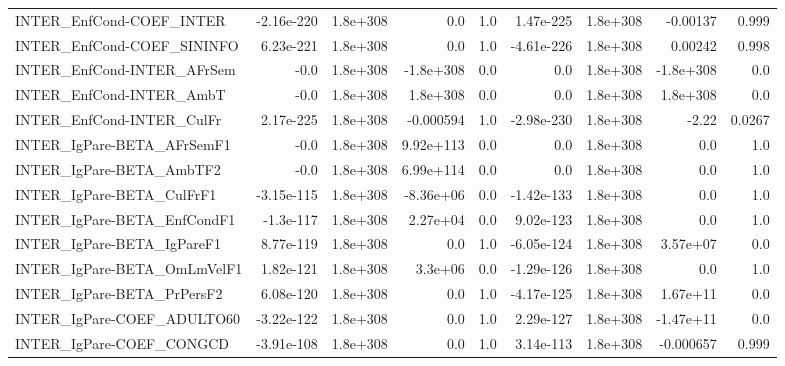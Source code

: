 \begin{tabular}{lrrrrrrrr}
INTER\_EnfCond-COEF\_INTER              &  -2.16e-220 &     1.8e+308 &        0.0 &      1.0 &  1.47e-225 &    1.8e+308 &     -0.00137 &         0.999 \\
INTER\_EnfCond-COEF\_SININFO            &   6.23e-221 &     1.8e+308 &        0.0 &      1.0 & -4.61e-226 &    1.8e+308 &      0.00242 &         0.998 \\
INTER\_EnfCond-INTER\_AFrSem            &        -0.0 &     1.8e+308 &  -1.8e+308 &      0.0 &        0.0 &    1.8e+308 &    -1.8e+308 &           0.0 \\
INTER\_EnfCond-INTER\_AmbT              &        -0.0 &     1.8e+308 &   1.8e+308 &      0.0 &        0.0 &    1.8e+308 &     1.8e+308 &           0.0 \\
INTER\_EnfCond-INTER\_CulFr             &   2.17e-225 &     1.8e+308 &  -0.000594 &      1.0 & -2.98e-230 &    1.8e+308 &        -2.22 &        0.0267 \\
INTER\_IgPare-BETA\_AFrSemF1            &        -0.0 &     1.8e+308 &  9.92e+113 &      0.0 &        0.0 &    1.8e+308 &          0.0 &           1.0 \\
INTER\_IgPare-BETA\_AmbTF2              &        -0.0 &     1.8e+308 &  6.99e+114 &      0.0 &        0.0 &    1.8e+308 &          0.0 &           1.0 \\
INTER\_IgPare-BETA\_CulFrF1             &  -3.15e-115 &     1.8e+308 &  -8.36e+06 &      0.0 & -1.42e-133 &    1.8e+308 &          0.0 &           1.0 \\
INTER\_IgPare-BETA\_EnfCondF1           &   -1.3e-117 &     1.8e+308 &   2.27e+04 &      0.0 &  9.02e-123 &    1.8e+308 &          0.0 &           1.0 \\
INTER\_IgPare-BETA\_IgPareF1            &   8.77e-119 &     1.8e+308 &        0.0 &      1.0 & -6.05e-124 &    1.8e+308 &     3.57e+07 &           0.0 \\
INTER\_IgPare-BETA\_OmLmVelF1           &   1.82e-121 &     1.8e+308 &    3.3e+06 &      0.0 & -1.29e-126 &    1.8e+308 &          0.0 &           1.0 \\
INTER\_IgPare-BETA\_PrPersF2            &   6.08e-120 &     1.8e+308 &        0.0 &      1.0 & -4.17e-125 &    1.8e+308 &     1.67e+11 &           0.0 \\
INTER\_IgPare-COEF\_ADULTO60            &  -3.22e-122 &     1.8e+308 &        0.0 &      1.0 &  2.29e-127 &    1.8e+308 &    -1.47e+11 &           0.0 \\
INTER\_IgPare-COEF\_CONGCD              &  -3.91e-108 &     1.8e+308 &        0.0 &      1.0 &  3.14e-113 &    1.8e+308 &    -0.000657 &         0.999 \\

\end{tabular}
